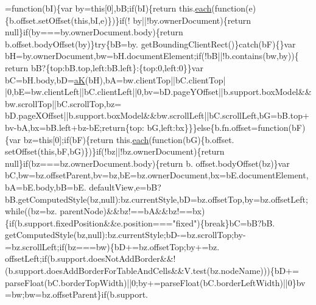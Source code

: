 \begin{DoxyCode}
      =\textcolor{keyword}{function}(bI)\{var by=\textcolor{keyword}{this}[0],bB;\textcolor{keywordflow}{if}(bI)\{\textcolor{keywordflow}{return} this.\hyperlink{jquery_8js_a871ff39db627c54c710a3e9909b8234c}{each}(\textcolor{keyword}{function}(e)\{b.offset.setOffset(\textcolor{keyword}{this},bI,e)\})\}\textcolor{keywordflow}{if}(!
      by||!by.ownerDocument)\{\textcolor{keywordflow}{return} null\}\textcolor{keywordflow}{if}(by===by.ownerDocument.body)\{\textcolor{keywordflow}{return} b.offset.bodyOffset(by)\}\textcolor{keywordflow}{try}\{bB=by.
      getBoundingClientRect()\}\textcolor{keywordflow}{catch}(bF)\{\}var bH=by.ownerDocument,bw=bH.documentElement;\textcolor{keywordflow}{if}(!bB||!b.contains(bw,by))\{\textcolor{keywordflow}{
      return} bB?\{top:bB.top,left:bB.left\}:\{top:0,left:0\}\}var bC=bH.body,bD=\hyperlink{jquery_8js_a7d370833f2145fc5f6c371e98d754eb4}{aK}(bH),bA=bw.clientTop||bC.clientTop|
      |0,bE=bw.clientLeft||bC.clientLeft||0,bv=bD.pageYOffset||b.support.boxModel&&bw.scrollTop||bC.scrollTop,bz=
      bD.pageXOffset||b.support.boxModel&&bw.scrollLeft||bC.scrollLeft,bG=bB.top+bv-bA,bx=bB.left+bz-bE;\textcolor{keywordflow}{return}\{top:
      bG,left:bx\}\}\}\textcolor{keywordflow}{else}\{b.fn.offset=\textcolor{keyword}{function}(bF)\{var bz=\textcolor{keyword}{this}[0];\textcolor{keywordflow}{if}(bF)\{\textcolor{keywordflow}{return} this.\hyperlink{jquery_8js_a871ff39db627c54c710a3e9909b8234c}{each}(\textcolor{keyword}{function}(bG)\{b.offset.
      setOffset(\textcolor{keyword}{this},bF,bG)\})\}\textcolor{keywordflow}{if}(!bz||!bz.ownerDocument)\{\textcolor{keywordflow}{return} null\}\textcolor{keywordflow}{if}(bz===bz.ownerDocument.body)\{\textcolor{keywordflow}{return} b.
      offset.bodyOffset(bz)\}var bC,bw=bz.offsetParent,bv=bz,bE=bz.ownerDocument,bx=bE.documentElement,bA=bE.body,bB=bE.
      defaultView,e=bB?bB.getComputedStyle(bz,null):bz.currentStyle,bD=bz.offsetTop,by=bz.offsetLeft;\textcolor{keywordflow}{while}((bz=bz.
      parentNode)&&bz!==bA&&bz!==bx)\{\textcolor{keywordflow}{if}(b.support.fixedPosition&&e.position===\textcolor{stringliteral}{"fixed"})\{\textcolor{keywordflow}{break}\}bC=bB?bB.
      getComputedStyle(bz,null):bz.currentStyle;bD-=bz.scrollTop;by-=bz.scrollLeft;\textcolor{keywordflow}{if}(bz===bw)\{bD+=bz.offsetTop;by+=bz.
      offsetLeft;\textcolor{keywordflow}{if}(b.support.doesNotAddBorder&&!(b.support.doesAddBorderForTableAndCells&&V.test(bz.nodeName)))\{bD+=
      parseFloat(bC.borderTopWidth)||0;by+=parseFloat(bC.borderLeftWidth)||0\}bv=bw;bw=bz.offsetParent\}\textcolor{keywordflow}{if}(b.support.

\end{DoxyCode}
